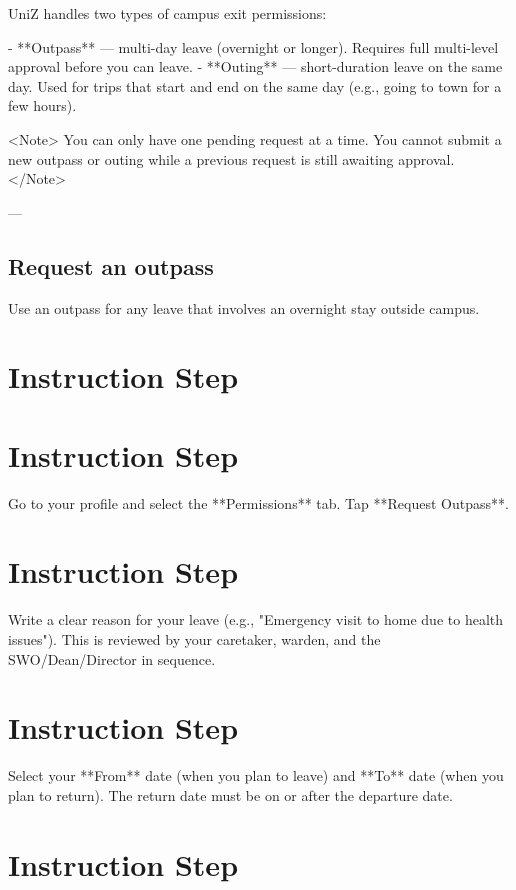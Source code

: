 


UniZ handles two types of campus exit permissions:

- **Outpass** — multi-day leave (overnight or longer). Requires full multi-level approval before you can leave.
- **Outing** — short-duration leave on the same day. Used for trips that start and end on the same day (e.g., going to town for a few hours).

<Note>
  You can only have one pending request at a time. You cannot submit a new
  outpass or outing while a previous request is still awaiting approval.
</Note>

---

\subsection{Request an outpass}

Use an outpass for any leave that involves an overnight stay outside campus.


\section{Instruction Step}

  
\section{Instruction Step}

    Go to your profile and select the **Permissions** tab. Tap **Request Outpass**.
  
  
\section{Instruction Step}

    Write a clear reason for your leave (e.g., "Emergency visit to home due to health issues"). This is reviewed by your caretaker, warden, and the SWO/Dean/Director in sequence.
  
  
\section{Instruction Step}

    Select your **From** date (when you plan to leave) and **To** date (when you plan to return). The return date must be on or after the departure date.
  
  
\section{Instruction Step}

